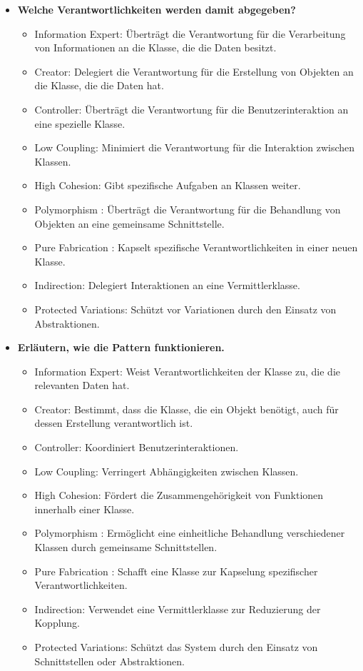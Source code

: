 \documentclass[main.tex]{subfiles}
\begin{document}
\begin{itemize}
    \item \textbf{Welche Verantwortlichkeiten werden damit abgegeben?}
    \begin{itemize}
        \item \gls{Information Expert}: Überträgt die Verantwortung für die Verarbeitung von Informationen an die Klasse, die die Daten besitzt.
        \item Creator: Delegiert die Verantwortung für die Erstellung von Objekten an die Klasse, die die Daten hat.
        \item Controller: Überträgt die Verantwortung für die Benutzerinteraktion an eine spezielle Klasse.
        \item  \gls{Low Coupling}: Minimiert die Verantwortung für die Interaktion zwischen Klassen.
        \item \gls{High Cohesion}: Gibt spezifische Aufgaben an Klassen weiter.
        \item \gls{Polymorphism} : Überträgt die Verantwortung für die Behandlung von Objekten an eine gemeinsame Schnittstelle.
        \item \gls{Pure Fabrication} : Kapselt spezifische Verantwortlichkeiten in einer neuen Klasse.
        \item Indirection: Delegiert Interaktionen an eine Vermittlerklasse.
        \item Protected Variations: Schützt vor Variationen durch den Einsatz von Abstraktionen.
    \end{itemize}
     \item \textbf{Erläutern, wie die Pattern funktionieren.}
    \begin{itemize}
        \item \gls{Information Expert}: Weist Verantwortlichkeiten der Klasse zu, die die relevanten Daten hat.
        \item Creator: Bestimmt, dass die Klasse, die ein Objekt benötigt, auch für dessen Erstellung verantwortlich ist.
        \item Controller: Koordiniert Benutzerinteraktionen.
        \item  \gls{Low Coupling}: Verringert Abhängigkeiten zwischen Klassen.
        \item \gls{High Cohesion}: Fördert die Zusammengehörigkeit von Funktionen innerhalb einer Klasse.
        \item \gls{Polymorphism} : Ermöglicht eine einheitliche Behandlung verschiedener Klassen durch gemeinsame Schnittstellen.
        \item \gls{Pure Fabrication} : Schafft eine Klasse zur Kapselung spezifischer Verantwortlichkeiten.
        \item Indirection: Verwendet eine Vermittlerklasse zur Reduzierung der Kopplung.
        \item Protected Variations: Schützt das System durch den Einsatz von Schnittstellen oder Abstraktionen.
    \end{itemize}
\end{itemize}
\end{document}
